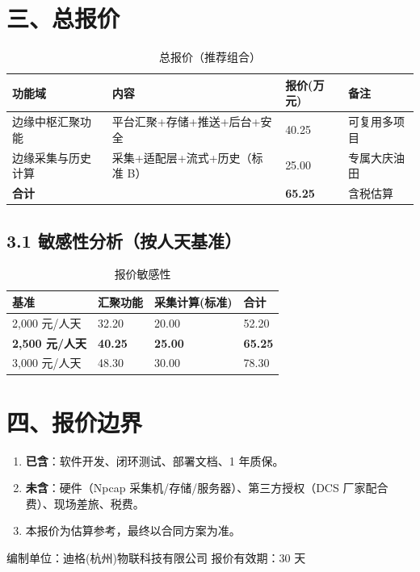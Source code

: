 \documentclass[11pt,a4paper]{ctexart}
\begin{document}
\section{三、总报价}

\begin{table}[H]\centering
\caption{总报价（推荐组合）}
\begin{tabular}{p{4.5cm} p{3cm} p{2.5cm} p{3.5cm}}
\toprule
\textbf{功能域} & \textbf{内容} & \textbf{报价(万元)} & \textbf{备注} \\
\midrule
边缘中枢汇聚功能 & 平台汇聚+存储+推送+后台+安全 & 40.25 & 可复用多项目 \\
边缘采集与历史计算 & 采集+适配层+流式+历史（标准 B） & 25.00 & 专属大庆油田 \\
\midrule
\textbf{合计} & & \textbf{65.25} & 含税估算 \\
\bottomrule
\end{tabular}
\end{table}

\subsection{3.1 敏感性分析（按人天基准）}

\begin{table}[H]\centering
\caption{报价敏感性}
\begin{tabular}{p{3cm} p{2.8cm} p{2.8cm} p{2.8cm}}
\toprule
\textbf{基准} & \textbf{汇聚功能} & \textbf{采集计算(标准)} & \textbf{合计} \\
\midrule
2,000 元/人天 & 32.20 & 20.00 & 52.20 \\
\textbf{2,500 元/人天} & \textbf{40.25} & \textbf{25.00} & \textbf{65.25} \\
3,000 元/人天 & 48.30 & 30.00 & 78.30 \\
\bottomrule
\end{tabular}
\end{table}

\section{四、报价边界}

\begin{enumerate}[leftmargin=*]
  \item \textbf{已含}：软件开发、闭环测试、部署文档、1 年质保。
  \item \textbf{未含}：硬件（Npcap 采集机/存储/服务器）、第三方授权（DCS 厂家配合费）、现场差旅、税费。
  \item 本报价为估算参考，最终以合同方案为准。
\end{enumerate}

\vspace{2em}
\noindent\hrulefill
\vspace{1em}

\begin{center}
\small 编制单位：迪格(杭州)物联科技有限公司 \quad 报价有效期：30 天
\end{center}
\end{document}
